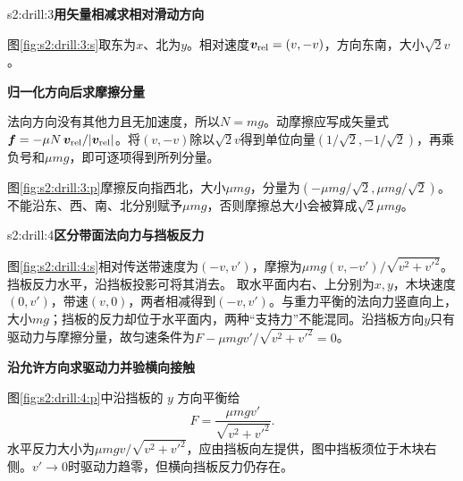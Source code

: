 \begin{drillsolution}{s2:drill:3}\textbf{用矢量相减求相对滑动方向}\par\nobreak
图\ref{fig:s2:drill:3:s}取东为$x$、北为$y$。相对速度$\boldsymbol v_{\rm rel}=(v,-v)$，方向东南，大小$\sqrt2v$。


\par\medskip{}\noindent\textbf{归一化方向后求摩擦分量}\par\nobreak
法向方向没有其他力且无加速度，所以$N=mg$。动摩擦应写成矢量式$\boldsymbol f=-\mu N\,\boldsymbol v_{\rm rel}/|\boldsymbol v_{\rm rel}|$。将$(v,-v)$除以$\sqrt2v$得到单位向量$(1/\sqrt2,-1/\sqrt2)$，再乘负号和$\mu mg$，即可逐项得到所列分量。

图\ref{fig:s2:drill:3:p}摩擦反向指西北，大小$\mu mg$，分量为$(-\mu mg/\sqrt2,\mu mg/\sqrt2)$。不能沿东、西、南、北分别赋予$\mu mg$，否则摩擦总大小会被算成$\sqrt2\mu mg$。\end{drillsolution}
\begin{drillsolution}{s2:drill:4}\textbf{区分带面法向力与挡板反力}\par\nobreak
图\ref{fig:s2:drill:4:s}相对传送带速度为$(-v,v')$，摩擦为$\mu mg(v,-v')/\sqrt{v^2+v'^2}$。挡板反力水平，沿挡板投影可将其消去。
取水平面内右、上分别为$x,y$，木块速度$(0,v')$，带速$(v,0)$，两者相减得到$(-v,v')$。与重力平衡的法向力竖直向上，大小$mg$；挡板的反力却位于水平面内，两种“支持力”不能混同。沿挡板方向$y$只有驱动力与摩擦分量，故匀速条件为$F-\mu mgv'/\sqrt{v^2+v'^2}=0$。



\par\medskip{}\noindent\textbf{沿允许方向求驱动力并验横向接触}\par\nobreak
图\ref{fig:s2:drill:4:p}中沿挡板的 $y$ 方向平衡给
\[
F=\frac{\mu mgv'}{\sqrt{v^2+v'^2}}.
\]
水平反力大小为$\mu mgv/\sqrt{v^2+v'^2}$，应由挡板向左提供，图中挡板须位于木块右侧。$v'\to0$时驱动力趋零，但横向挡板反力仍存在。\end{drillsolution}
